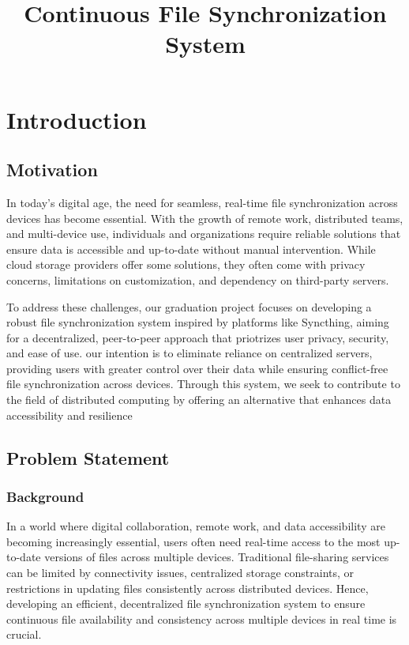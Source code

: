 \documentclass{book}
\title{
Continuous File Synchronization System 
}
\begin{document}
	
	\maketitle
	
	\chapter{Introduction}
		\section{Motivation}
    {
      In today's digital age, the need for seamless, real-time file synchronization across devices has become essential. With the growth of remote work, distributed teams, and multi-device use, individuals and organizations require reliable solutions that ensure data is accessible and up-to-date without manual intervention. While cloud storage providers offer some solutions, they often come with privacy concerns, limitations on customization, and dependency on third-party servers.

      To address these challenges, our graduation project focuses on developing a robust file synchronization system inspired by platforms like Syncthing, aiming for a decentralized, peer-to-peer approach that priotrizes user privacy, security, and ease of use. our intention is to eliminate reliance on centralized servers, providing users with greater control over their data while ensuring conflict-free file synchronization across devices. Through this system, we seek to contribute to the field of distributed computing by offering an alternative that enhances data accessibility and resilience
}

		\section{Problem Statement}
      \subsection*{Background}
      {
        In a world where digital collaboration, remote work, and data accessibility are becoming increasingly essential, users often need real-time access to the most up-to-date versions of files across multiple devices. Traditional file-sharing services can be limited by connectivity issues, centralized storage constraints, or restrictions in updating files consistently across distributed devices. Hence, developing an efficient, decentralized file synchronization system to ensure continuous file availability and consistency across multiple devices in real time is crucial.
      }
      
\end{document}

